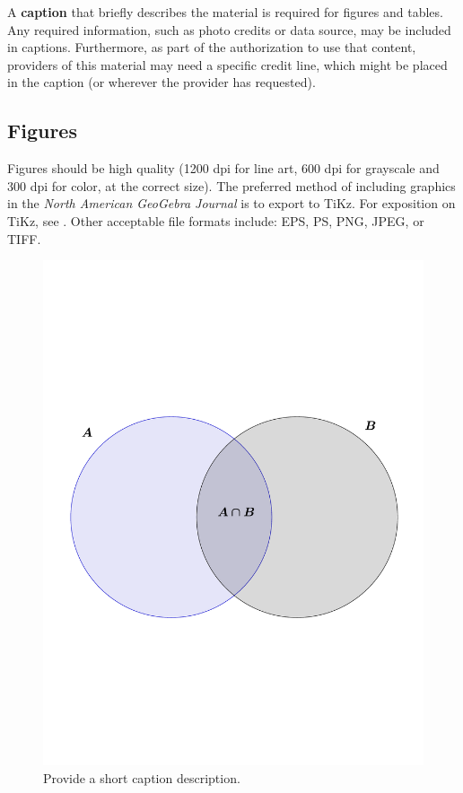 A \textbf{caption} that briefly describes the material is required for figures and tables.  Any required information, such as photo credits or data source, may be included in captions. Furthermore, as part of the authorization to use that content, providers of this material may need a specific credit line, which might be placed in the caption (or wherever the provider has requested).  
  
 \subsection{Figures}
Figures should be high quality (1200 dpi for line art, 600 dpi for grayscale and 300 dpi for color, at the correct size). The preferred method of including graphics in the \textit{North American GeoGebra Journal} is to export to TiKz.  For exposition on TiKz, see \citep{quinlan2013geogebra}.   
Other acceptable file formats include: EPS, PS, PNG, JPEG, or TIFF.  
  
 \begin{figure}[h!] %
    \centering
    \includegraphics[scale=0.5]{figs/venn.pdf} 
    \caption{Provide a short caption description.}
    \label{fig:number}
 \end{figure}
 
